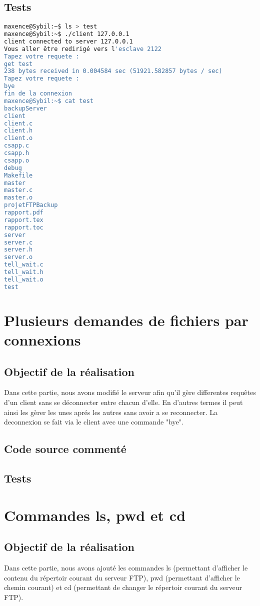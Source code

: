 \documentclass{report}
\begin{document}
      \section{Tests}
\begin{lstlisting}[frame=single,basicstyle=\footnotesize,language=bash]
maxence@Sybil:~$ ls > test
maxence@Sybil:~$ ./client 127.0.0.1
client connected to server 127.0.0.1
Vous aller être redirigé vers l'esclave 2122
Tapez votre requete :
get test
238 bytes received in 0.004584 sec (51921.582857 bytes / sec)
Tapez votre requete :
bye
fin de la connexion
maxence@Sybil:~$ cat test
backupServer
client
client.c
client.h
client.o
csapp.c
csapp.h
csapp.o
debug
Makefile
master
master.c
master.o
projetFTPBackup
rapport.pdf
rapport.tex
rapport.toc
server
server.c
server.h
server.o
tell_wait.c
tell_wait.h
tell_wait.o
test
\end{lstlisting}
    \chapter{Plusieurs demandes de fichiers par connexions}
      \section{Objectif de la r\'ealisation}
	Dans cette partie, nous avons modifi\'e le serveur afin qu'il g\`ere differentes requ\^etes d'un client sans se d\'econnecter entre chacun d'elle. En d'autres termes il peut ainsi les g\`erer les unes apr\'es les autres sans avoir a se reconnecter. La deconnexion se fait via le client avec une commande "bye".
      \section{Code source comment\'e}
      \section{Tests}

    \chapter{Commandes ls, pwd et cd}
      \section{Objectif de la r\'ealisation}
	Dans cette partie, nous avons ajout\'e les commandes ls (permettant d'afficher le contenu du r\'epertoir courant du serveur FTP), pwd (permettant d'afficher le chemin courant) et cd (permettant de changer le r\'epertoir courant du serveur FTP). \\
\end{document}
